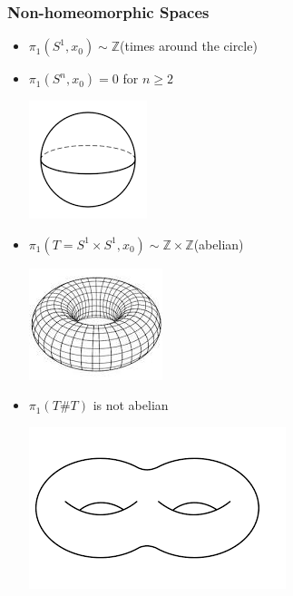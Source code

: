 \documentclass{beamer}
\newcommand{\Z}{\mathbb{Z}}
\begin{document}
\begin{frame}
  \frametitle{Non-homeomorphic Spaces}
  \begin{itemize}
  \item \(\pi_1(S^1,x_0)\sim\Z\)\qquad(times around the circle)

    \begin{center}
    \end{center}

  \item \(\pi_1(S^n,x_0)=0\) for \(n\ge2\)

    \begin{center}
      \includegraphics[scale=0.25]{sphere}
    \end{center}

  \item \(\pi_1(T=S^1\times S^1,x_0)\sim\Z\times\Z\)\qquad(abelian)

    \begin{center}
      \includegraphics[scale=0.25]{torus}
    \end{center}

  \item \(\pi_1(T\#T)\) is not abelian

    \begin{center}
      \includegraphics[scale=0.25]{dtorus}
    \end{center}
  \end{itemize}
\end{frame}
\end{document}
